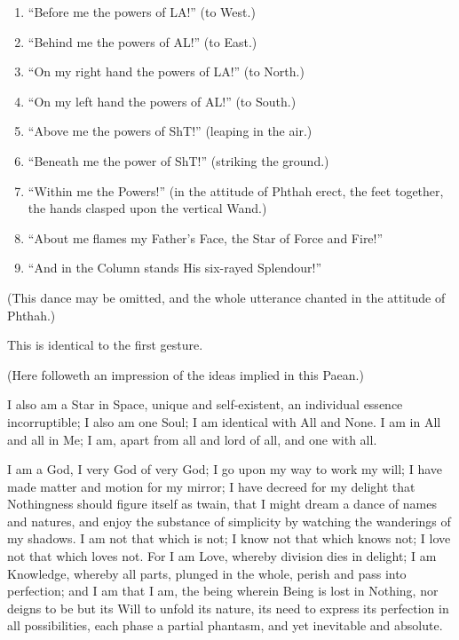 \begin{enumerate}[label=\alph*.]
\item \enquote{Before me the powers of LA!} (to West.)
\item \enquote{Behind me the powers of AL!} (to East.)
\item \enquote{On my right hand the powers of LA!} (to North.)
\item \enquote{On my left hand the powers of AL!} (to South.)
\item \enquote{Above me the powers of ShT!} (leaping in the air.)
\item \enquote{Beneath me the power of ShT!} (striking the ground.)
\item \enquote{Within me the Powers!} (in the attitude of Phthah erect, the feet together, the hands clasped upon the vertical Wand.)
\item \enquote{About me flames my Father's Face, the Star of Force and Fire!}
\item \enquote{And in the Column stands His six-rayed Splendour!}
\end{enumerate}

(This dance may be omitted, and the whole utterance chanted in the attitude of Phthah.)


This is identical to the first gesture.
\raggedbottom\pagebreak

(Here followeth an impression of the ideas implied in this Paean.)


I also am a Star in Space, unique and self-existent, an individual
essence incorruptible; I also am one Soul; I am identical with All
and None. I am in All and all in Me; I am, apart from all and
lord of all, and one with all.

I am a God, I very God of very God; I go upon my way to work my will; I have made matter and motion for my mirror; I have decreed for my delight that Nothingness should figure itself as twain, that I might dream a dance of names and natures, and enjoy the substance of simplicity by watching the wanderings of my shadows. I am not that which is not; I know not that which knows not; I love not that which loves not. For I am Love, whereby division dies in delight; I am Knowledge, whereby all parts, plunged in the whole, perish and pass into perfection; and I am that I am, the being wherein Being is lost in Nothing, nor deigns to be but its Will to unfold its nature, its need to express its perfection in all possibilities, each phase a partial phantasm, and yet inevitable and absolute.


